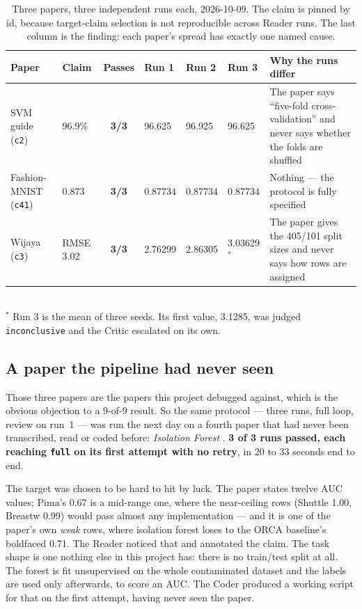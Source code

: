 \documentclass[11pt]{article}
\newcommand{\squeeze}{\setlength{\tabcolsep}{4pt}}
\begin{document}
\begin{table}[tbp]
\centering
\small
\caption{Three papers, three independent runs each, 2026-10-09. The claim is pinned by id,
because target-claim selection is not reproducible across Reader runs. The last column is the
finding: each paper's spread has exactly one named cause.}
\label{tab:repeat}
\squeeze
\begin{tabular}{L{0.17\textwidth}L{0.09\textwidth}cL{0.07\textwidth}L{0.07\textwidth}L{0.07\textwidth}L{0.29\textwidth}}
\toprule
Paper & Claim & Passes & Run 1 & Run 2 & Run 3 & Why the runs differ \\
\midrule
SVM guide (\texttt{c2}) & 96.9\% & \textbf{3/3} & 96.625 & 96.925 & 96.625 & The paper says
  ``five-fold cross-validation'' and never says whether the folds are shuffled \\
Fashion-MNIST (\texttt{c41}) & 0.873 & \textbf{3/3} & 0.87734 & 0.87734 & 0.87734 & Nothing --- the
  protocol is fully specified \\
Wijaya (\texttt{c3}) & RMSE 3.02 & \textbf{3/3} & 2.76299 & 2.86305 & 3.03629$^{*}$ & The paper
  gives the 405/101 split sizes and never says how rows are assigned \\
\bottomrule
\end{tabular}
\\[2pt]
{\small $^{*}$ Run 3 is the mean of three seeds. Its first value, 3.1285, was judged
\texttt{inconclusive} and the Critic escalated on its own.}
\end{table}

\subsection{A paper the pipeline had never seen}
\label{sec:unseen}

Those three papers are the papers this project debugged against, which is the obvious objection
to a 9-of-9 result. So the same protocol --- three runs, full loop, review on run~1 --- was run
the next day on a fourth paper that had never been transcribed, read or coded before:
\emph{Isolation Forest} \cite{liu2008iforest}. \textbf{3 of 3 runs passed, each reaching
\texttt{full} on its first attempt with no retry}, in 20 to 33 seconds end to end.

The target was chosen to be hard to hit by luck. The paper states twelve AUC values; Pima's
0.67 is a mid-range one, where the near-ceiling rows (Shuttle 1.00, Breastw 0.99) would pass
almost any implementation --- and it is one of the paper's own \emph{weak} rows, where isolation
forest loses to the ORCA baseline's boldfaced 0.71. The Reader noticed that and annotated the
claim. The task shape is one nothing else in this project has: there is no train/test split at
all. The forest is fit unsupervised on the whole contaminated dataset and the labels are used
only afterwards, to score an AUC. The Coder produced a working script for that on the first
attempt, having never seen the paper.
\end{document}
